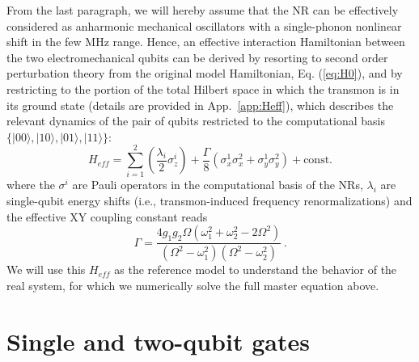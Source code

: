 \documentclass[aps,twocolumn,groupedaddress,superscriptaddress,floatfix,amsmath,amssymb,prb]{revtex4-1}
\begin{document}
From the last paragraph, we will hereby assume that the NR can be effectively considered as anharmonic mechanical oscillators with a single-phonon nonlinear shift in the few MHz range. Hence, an effective interaction Hamiltonian between the two electromechanical qubits can be derived by resorting to second order perturbation theory from the original model Hamiltonian, Eq. (\ref{eq:H0}), and by restricting to the portion of the total Hilbert space in which the transmon is in its ground state (details are provided in App.~\ref{app:Heff}), which describes the relevant dynamics of the pair of qubits restricted to the computational basis $\{|00\rangle, |10\rangle,|01\rangle, |11\rangle\}$:
\begin{equation}
H_{eff} = \sum_{i=1}^2 \left(\frac{\lambda_i}{2}\sigma^i_{z}\right) + \frac{\Gamma}{8} \left( \sigma^1_x\sigma^2_x +\sigma^1_y\sigma^2_y \right) + \text{const.}
\label{eq:Heff_main}
\end{equation}
where the $\sigma^i$ are Pauli operators in the computational basis of the NRs, $\lambda_i$ are single-qubit energy shifts (i.e., transmon-induced frequency renormalizations) and the effective XY coupling constant reads
\begin{equation}
\Gamma = \frac{4 g_1 g_2 \Omega(\omega_1^2 + \omega_2^2 -2\Omega^2)}{(\Omega^2 - \omega_1^2)(\Omega^2 - \omega_2^2)} \, . 
\end{equation}
We will use this $H_{eff}$ as the reference model to understand the behavior of the real system, for which we numerically solve the full master equation above. 


\section{Single and two-qubit gates}
\end{document}
